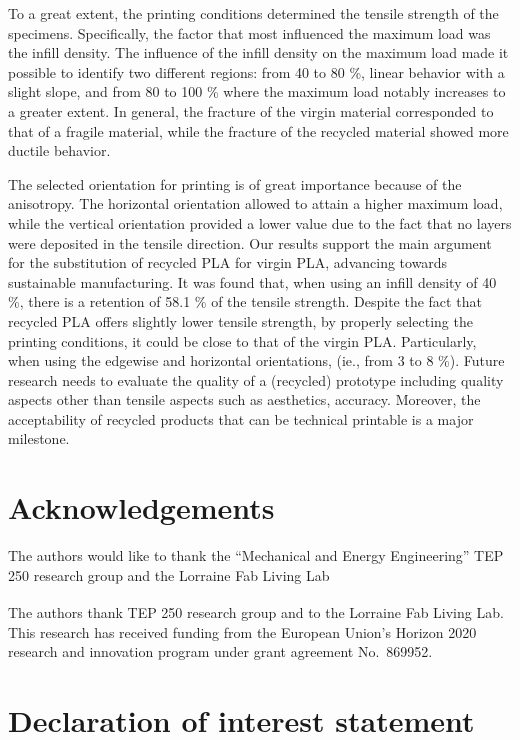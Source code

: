 \documentclass[
  12pt]{article}
\begin{document}
To a great extent, the printing conditions determined the tensile strength of the specimens. Specifically, the factor that most influenced the maximum load was the infill density.
The influence of the infill density on the maximum load made it possible to identify two different regions: from 40 to 80 \%, linear behavior with a slight slope, and from 80 to 100 \% where the maximum load notably increases to a greater extent. In general, the fracture of the virgin material corresponded to that of a fragile material, while the fracture of the recycled material showed more ductile behavior.

The selected orientation for printing is of great importance because of the anisotropy. The horizontal orientation allowed to attain a higher maximum load, while the vertical orientation provided a lower value due to the fact that no layers were deposited in the tensile direction.
Our results support the main argument for the substitution of recycled PLA for virgin PLA, advancing towards sustainable manufacturing. It was found that, when using an infill density of 40 \%, there is a retention of 58.1 \% of the tensile strength. Despite the fact that recycled PLA offers slightly lower tensile strength, by properly selecting the printing conditions, it could be close to that of the virgin PLA. Particularly, when using the edgewise and horizontal orientations, (ie., from 3 to 8 \%).
Future research needs to evaluate the quality of a (recycled) prototype including quality aspects other than tensile aspects such as aesthetics, accuracy.
Moreover, the acceptability of recycled products that can be technical printable is a major milestone.

\newpage

\hypertarget{acknowledgements}{%
\section{Acknowledgements}\label{acknowledgements}}

The authors would like to thank the ``Mechanical and Energy Engineering'' TEP 250 research group and the Lorraine Fab Living Lab

The authors thank TEP 250 research group and to the Lorraine Fab Living Lab\textsuperscript{\textregistered}.
This research has received funding from the European Union's Horizon 2020 research and innovation program under grant agreement No.~869952.

\hypertarget{declaration-of-interest-statement}{%
\section{Declaration of interest statement}\label{declaration-of-interest-statement}}
\end{document}
